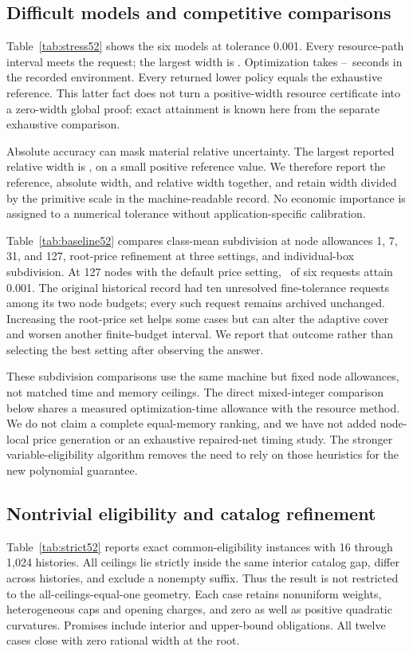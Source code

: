 \subsection{Difficult models and competitive comparisons}
Table~\ref{tab:stress52} shows the six models at tolerance 0.001. Every resource-path interval meets the request; the largest width is \FineMaxGap. Optimization takes \FineMinTime--\FineMaxTime\ seconds in the recorded environment. Every returned lower policy equals the exhaustive reference. This latter fact does not turn a positive-width resource certificate into a zero-width global proof: exact attainment is known here from the separate exhaustive comparison.

Absolute accuracy can mask material relative uncertainty. The largest reported relative width is \FineMaxRelative, on a small positive reference value. We therefore report the reference, absolute width, and relative width together, and retain width divided by the primitive scale in the machine-readable record. No economic importance is assigned to a numerical tolerance without application-specific calibration.

Table~\ref{tab:baseline52} compares class-mean subdivision at node allowances 1, 7, 31, and 127, root-price refinement at three settings, and individual-box subdivision. At 127 nodes with the default price setting, \GroupNOneComplete\ of six requests attain 0.001. The original historical record had ten unresolved fine-tolerance requests among its two node budgets; every such request remains archived unchanged. Increasing the root-price set helps some cases but can alter the adaptive cover and worsen another finite-budget interval. We report that outcome rather than selecting the best setting after observing the answer.

These subdivision comparisons use the same machine but fixed node allowances, not matched time and memory ceilings. The direct mixed-integer comparison below shares a measured optimization-time allowance with the resource method. We do not claim a complete equal-memory ranking, and we have not added node-local price generation or an exhaustive repaired-net timing study. The stronger variable-eligibility algorithm removes the need to rely on those heuristics for the new polynomial guarantee.

\subsection{Nontrivial eligibility and catalog refinement}
Table~\ref{tab:strict52} reports exact common-eligibility instances with 16 through 1,024 histories. All ceilings lie strictly inside the same interior catalog gap, differ across histories, and exclude a nonempty suffix. Thus the result is not restricted to the all-ceilings-equal-one geometry. Each case retains nonuniform weights, heterogeneous caps and opening charges, and zero as well as positive quadratic curvatures. Promises include interior and upper-bound obligations. All twelve cases close with zero rational width at the root.

